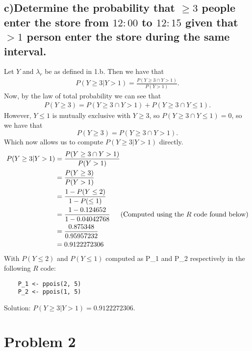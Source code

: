 \documentclass[11pt, letterpaper]{article}
\begin{document}
\subsection*{c)\normalfont Determine the probability that $\geq 3$ people enter the store from $12:00$
to $12:15$ given that $>1$ person enter the store during the same interval.}
Let $Y$ and $\lambda_r$ be as defined in 1.b. Then we have that
\begin{align*}
    P(Y\geq 3|Y>1)=\frac{P(Y\geq 3\cap Y>1)}{P(Y>1)}.
\end{align*}
Now, by the law of total probability we can see that
\begin{align*}
    P(Y\geq 3)=P(Y\geq 3\cap Y>1)+P(Y\geq 3\cap Y\leq 1).
\end{align*}
However, $Y\leq 1$ is mutually exclusive with $Y\geq 3$, so $P(Y\geq 3 \cap Y\leq 1)=0$, so we have that
\[P(Y\geq 3)=P(Y\geq 3\cap Y>1).\]
Which now allows us to compute $P(Y\geq 3|Y>1)$ directly.
\begin{align*}
    P(Y\geq 3|Y>1)&=\frac{P(Y\geq 3\cap Y>1)}{P(Y>1)}\\
    &=\frac{P(Y\geq 3)}{P(Y>1)}\\
    &=\frac{1-P(Y\leq 2)}{1-P(\leq 1)}\\
    &=\frac{1-0.124652}{1-0.04042768} \text{\indent (Computed using the $R$ code found below)}\\
    &=\frac{0.875348}{0.95957232}\\
    &=0.9122272306
\end{align*}
With $P(Y\leq 2)$ and $P(Y\leq 1)$ computed as P\_1 and P\_2 respectively in the following $R$ code:
\begin{verbatim}
    P_1 <- ppois(2, 5)
    P_2 <- ppois(1, 5)
\end{verbatim}
Solution: $P(Y\geq 3|Y>1)=0.9122272306$.

\section*{Problem 2}
\end{document}
